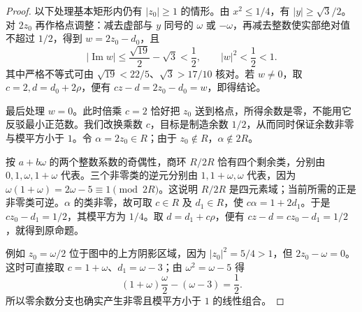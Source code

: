 \begin{proof}
	以下处理基本矩形内仍有 \(\lvert z_0\rvert\geq1\) 的情形。由 \(x^2\leq1/4\)，有 \(\lvert y\rvert\geq\sqrt3/2\)。对 \(2z_0\) 再作格点调整：减去虚部与 \(y\) 同号的 \(\omega\) 或 \(-\omega\)，再减去整数使实部绝对值不超过 \(1/2\)，得到 \(w=2z_0-d_0\)，且
	\[
		\lvert\operatorname{Im}w\rvert \leq\frac{\sqrt{19}}2-\sqrt3<\frac12, \qquad \lvert w\rvert^2<\frac12<1.
	\]
	其中严格不等式可由 \(\sqrt{19}<22/5\)、\(\sqrt3>17/10\) 核对。若 \(w\ne0\)，取 \(c=2,d=d_0+2\rho\)，便有 \(cz-d=2z_0-d_0=w\)，即得结论。

	最后处理 \(w=0\)。此时倍乘 \(c=2\) 恰好把 \(z_0\) 送到格点，所得余数是零，不能用它反驳最小正范数。我们改换乘数 \(c\)，目标是制造余数 \(1/2\)，从而同时保证余数非零与模平方小于 \(1\)。令 \(\alpha=2z_0\in R\)；由于 \(z_0\notin R\)，\(\alpha\notin2R\)。

	按 \(a+b\omega\) 的两个整数系数的奇偶性，商环 \(R/2R\) 恰有四个剩余类，分别由 \(0,1,\omega,1+\omega\) 代表。三个非零类的逆元分别由 \(1,1+\omega,\omega\) 代表，因为 \(\omega(1+\omega)=2\omega-5\equiv1\pmod{2R}\)。这说明 \(R/2R\) 是四元素域；当前所需的正是非零类可逆。\(\alpha\) 的类非零，故可取 \(c\in R\) 及 \(d_1\in R\)，使 \(c\alpha=1+2d_1\)。于是 \(cz_0-d_1=1/2\)，其模平方为 \(1/4\)。取 \(d=d_1+c\rho\)，便有 \(cz-d=cz_0-d_1=1/2\)，就得到原命题。

	例如 \(z_0=\omega/2\) 位于图中的上方阴影区域，因为 \(\lvert z_0\rvert^2=5/4>1\)，但 \(2z_0-\omega=0\)。这时可直接取 \(c=1+\omega\)、\(d_1=\omega-3\)；由 \(\omega^2=\omega-5\) 得
	\[
		(1+\omega)\frac{\omega}{2}-(\omega-3)=\frac12.
	\]
	所以零余数分支也确实产生非零且模平方小于 \(1\) 的线性组合。
\end{proof}

